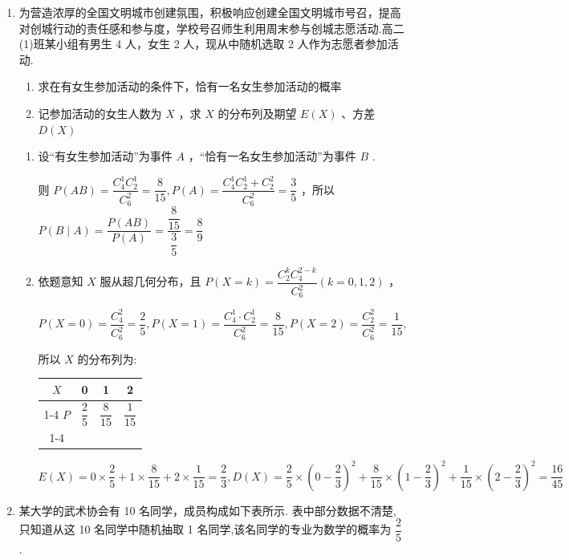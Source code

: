\begin{enumerate}
\begin{enumerate}
    \item 为营造浓厚的全国文明城市创建氛围，积极响应创建全国文明城市号召，提高对创城行动的责任感和参与度，学校号召师生利用周末参与创城志愿活动.高二(1)班某小组有男生 4 人，女生 2 人，现从中随机选取 2 人作为志愿者参加活动.
    \begin{enumerate}
        \item 求在有女生参加活动的条件下，恰有一名女生参加活动的概率
        \item 记参加活动的女生人数为 $X$ ，求 $X$ 的分布列及期望 $E\left( X\right)$ 、方差 $D\left( X\right)$
    \end{enumerate}
    \begin{jieda}
        \begin{enumerate}
            \item 设“有女生参加活动”为事件 $A$ ，“恰有一名女生参加活动”为事件 $B$ .
            
            则 $P\left( {AB}\right)  = \dfrac{{{C}}_{4}^{1}{{C}}_{2}^{1}}{{{C}}_{6}^{2}} = \dfrac{8}{15},P\left( A\right)  = \dfrac{{{C}}_{4}^{1}{{C}}_{2}^{1} + {{C}}_{2}^{2}}{{{C}}_{6}^{2}} = \dfrac{3}{5}$ ，所以 $P\left( {B \mid  A}\right)  = \dfrac{P\left( {AB}\right) }{P\left( A\right) } = \dfrac{\dfrac{8}{15}}{\dfrac{3}{5}} = \dfrac{8}{9}$ 
            \item 依题意知 $X$ 服从超几何分布，且 $P\left( {X = k}\right)  = \dfrac{C_{2}^{k}C_{4}^{2 - k}}{C_{6}^{2}}\left( {k = 0,1,2}\right)$ ，
            
            $P\left( {X = 0}\right)  = \dfrac{{{C}}_{4}^{2}}{{{C}}_{6}^{2}} = \dfrac{2}{5},P\left( {X = 1}\right)  = \dfrac{{{C}}_{4}^{1} \cdot  {{C}}_{2}^{1}}{{{C}}_{6}^{2}} = \dfrac{8}{15},P\left( {X = 2}\right)  = \dfrac{{{C}}_{2}^{2}}{{{C}}_{6}^{2}} = \dfrac{1}{15},$
            
            所以 $X$ 的分布列为:
            
            \begin{center}
            \begin{tabular}{|c|c|c|c|}
            \hline
            $X$ & 0 & 1 & 2 \\
            \cline{1-4}
            $P$ & $\dfrac{2}{5}$ & $\dfrac{8}{15}$ & $\dfrac{1}{15}$ \\
            \cline{1-4}
            \hline
            \end{tabular}
            \end{center}
            
            $E\left( X\right)  = 0 \times  \dfrac{2}{5} + 1 \times  \dfrac{8}{15} + 2 \times  \dfrac{1}{15} = \dfrac{2}{3},D\left( X\right)  = \dfrac{2}{5} \times  {\left( 0 - \dfrac{2}{3}\right) }^{2} + \dfrac{8}{15} \times  {\left( 1 - \dfrac{2}{3}\right) }^{2} + \dfrac{1}{15} \times  {\left( 2 - \dfrac{2}{3}\right) }^{2} = \dfrac{16}{45}$
        \end{enumerate}
    \end{jieda}
    \item 某大学的武术协会有 10 名同学，成员构成如下表所示. 表中部分数据不清楚,只知道从这 10 名同学中随机抽取 1 名同学,该名同学的专业为数学的概率为 $\dfrac{2}{5}$ .
    

\end{enumerate}
\end{enumerate}
